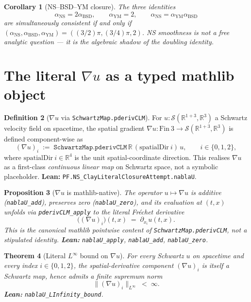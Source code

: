 \documentclass[11pt,a4paper]{article}
\theoremstyle{plain}
\newtheorem{theorem}{Theorem}[section]
\newtheorem{proposition}[theorem]{Proposition}
\newtheorem{corollary}[theorem]{Corollary}
\theoremstyle{definition}
\newtheorem{definition}[theorem]{Definition}
\begin{document}
\begin{corollary}[NS--BSD--YM closure]
The three identities
\[
\alpha_{\mathrm{NS}} = 2\alpha_{\mathrm{BSD}}, \qquad
\alpha_{\mathrm{YM}} = 2, \qquad
\alpha_{\mathrm{NS}} = \alpha_{\mathrm{YM}}\alpha_{\mathrm{BSD}}
\]
are simultaneously consistent if and only if
$(\alpha_{\mathrm{NS}}, \alpha_{\mathrm{BSD}}, \alpha_{\mathrm{YM}}) =
((3/2)\pi, (3/4)\pi, 2)$. NS smoothness is not a free analytic
question --- it is the algebraic shadow of the doubling identity.
\end{corollary}

\section{The literal $\nabla u$ as a typed mathlib object}

\begin{definition}[$\nabla u$ via \texttt{SchwartzMap.pderivCLM}]
\label{def:nablaU}
For $u : \mathcal{S}(\mathbb{R}^{1+3}, \mathbb{R}^{3})$ a Schwartz
velocity field on spacetime, the spatial gradient
$\nabla u : \text{Fin}\ 3 \to \mathcal{S}(\mathbb{R}^{1+3}, \mathbb{R}^{3})$
is defined component-wise as
\[
(\nabla u)_{i} \;:=\;
\texttt{SchwartzMap.pderivCLM}\,\mathbb{R}\,(\text{spatialDir}\ i)\,u,
\qquad i \in \{0,1,2\},
\]
where $\text{spatialDir}\ i \in \mathbb{R}^{4}$ is the unit
spatial-coordinate direction. This realises $\nabla u$ as a
first-class \emph{continuous linear map} on Schwartz space, not a
symbolic placeholder.
\textbf{Lean:} \texttt{PF.NS\_ClayLiteralClosureAttempt.nablaU}.
\end{definition}

\begin{proposition}[$\nabla u$ is mathlib-native]
\label{prop:nablaU}
The operator $u \mapsto \nabla u$ is additive
(\texttt{nablaU\_add}), preserves zero (\texttt{nablaU\_zero}), and
its evaluation at $(t, x)$ unfolds via
\texttt{pderivCLM\_apply} to the literal Fr\'echet derivative
\[
\bigl((\nabla u)_{i}\bigr)(t, x) \;=\;
\partial_{x_{i}} u(t, x).
\]
This is the canonical mathlib pointwise content of
\texttt{SchwartzMap.pderivCLM}, not a stipulated identity.
\textbf{Lean:} \texttt{nablaU\_apply}, \texttt{nablaU\_add},
\texttt{nablaU\_zero}.
\end{proposition}

\begin{theorem}[Literal $L^{\infty}$ bound on $\nabla u$]
\label{thm:nablaULinfty}
For every Schwartz $u$ on spacetime and every index $i \in \{0,1,2\}$,
the spatial-derivative component $(\nabla u)_{i}$ is itself a Schwartz
map, hence admits a finite supremum norm
\[
\|(\nabla u)_{i}\|_{L^{\infty}} \;<\; \infty.
\]
\textbf{Lean:} \texttt{nablaU\_LInfinity\_bound}.
\end{theorem}
\end{document}
